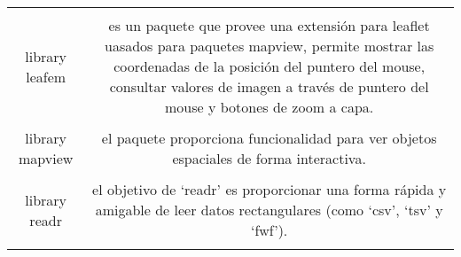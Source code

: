 \documentclass[11pt,]{article}
\begin{document}
\begin{longtable}[]{@{}cc@{}}
\begin{minipage}[t]{0.07\columnwidth}\centering\strut
\strut
\end{minipage} & \begin{minipage}[t]{0.88\columnwidth}\centering\strut
\strut
\end{minipage}\tabularnewline
\begin{minipage}[t]{0.07\columnwidth}\centering\strut
library leafem\strut
\end{minipage} & \begin{minipage}[t]{0.88\columnwidth}\centering\strut
es un paquete que provee una extensión para leaflet uasados para
paquetes mapview, permite mostrar las coordenadas de la posición del
puntero del mouse, consultar valores de imagen a través de puntero del
mouse y botones de zoom a capa.\strut
\end{minipage}\tabularnewline
\begin{minipage}[t]{0.07\columnwidth}\centering\strut
\strut
\end{minipage} & \begin{minipage}[t]{0.88\columnwidth}\centering\strut
\strut
\end{minipage}\tabularnewline
\begin{minipage}[t]{0.07\columnwidth}\centering\strut
library mapview\strut
\end{minipage} & \begin{minipage}[t]{0.88\columnwidth}\centering\strut
el paquete proporciona funcionalidad para ver objetos espaciales de
forma interactiva.\strut
\end{minipage}\tabularnewline
\begin{minipage}[t]{0.07\columnwidth}\centering\strut
\strut
\end{minipage} & \begin{minipage}[t]{0.88\columnwidth}\centering\strut
\strut
\end{minipage}\tabularnewline
\begin{minipage}[t]{0.07\columnwidth}\centering\strut
library readr\strut
\end{minipage} & \begin{minipage}[t]{0.88\columnwidth}\centering\strut
el objetivo de `readr' es proporcionar una forma rápida y amigable de
leer datos rectangulares (como `csv', `tsv' y `fwf').\strut
\end{minipage}\tabularnewline
\begin{minipage}[t]{0.07\columnwidth}\centering\strut
\strut
\end{minipage} & \begin{minipage}[t]{0.88\columnwidth}\centering\strut

\end{minipage}
\end{longtable}
\end{document}
